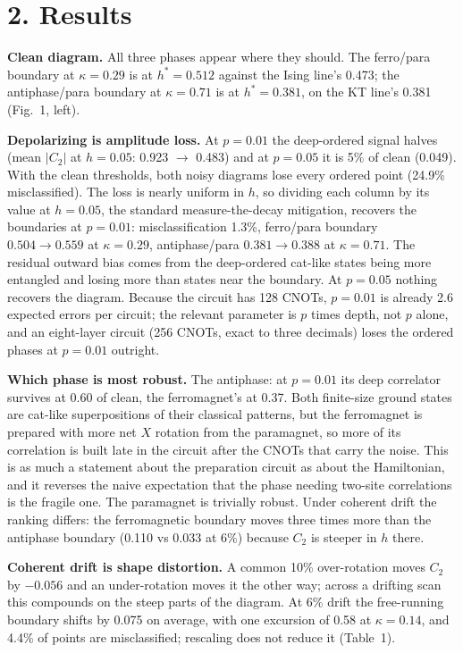 \documentclass[10pt,letterpaper]{article}
\begin{document}
\section*{2. Results}
\textbf{Clean diagram.} All three phases appear where they should. The ferro/para boundary at $\kappa=0.29$ is at $h^*=0.512$ against the Ising line's 0.473; the antiphase/para boundary at $\kappa=0.71$ is at $h^*=0.381$, on the KT line's 0.381 (Fig.~1, left).

\textbf{Depolarizing is amplitude loss.} At $p=0.01$ the deep-ordered signal halves (mean $|C_2|$ at $h=0.05$: 0.923 $\to$ 0.483) and at $p=0.05$ it is 5\% of clean (0.049). With the clean thresholds, both noisy diagrams lose every ordered point (24.9\% misclassified). The loss is nearly uniform in $h$, so dividing each column by its value at $h=0.05$, the standard measure-the-decay mitigation, recovers the boundaries at $p=0.01$: misclassification 1.3\%, ferro/para boundary $0.504\to0.559$ at $\kappa=0.29$, antiphase/para $0.381\to0.388$ at $\kappa=0.71$. The residual outward bias comes from the deep-ordered cat-like states being more entangled and losing more than states near the boundary. At $p=0.05$ nothing recovers the diagram. Because the circuit has 128 CNOTs, $p=0.01$ is already 2.6 expected errors per circuit; the relevant parameter is $p$ times depth, not $p$ alone, and an eight-layer circuit (256 CNOTs, exact to three decimals) loses the ordered phases at $p=0.01$ outright.

\textbf{Which phase is most robust.} The antiphase: at $p=0.01$ its deep correlator survives at 0.60 of clean, the ferromagnet's at 0.37. Both finite-size ground states are cat-like superpositions of their classical patterns, but the ferromagnet is prepared with more net $X$ rotation from the paramagnet, so more of its correlation is built late in the circuit after the CNOTs that carry the noise. This is as much a statement about the preparation circuit as about the Hamiltonian, and it reverses the naive expectation that the phase needing two-site correlations is the fragile one. The paramagnet is trivially robust. Under coherent drift the ranking differs: the ferromagnetic boundary moves three times more than the antiphase boundary (0.110 vs 0.033 at 6\%) because $C_2$ is steeper in $h$ there.

\textbf{Coherent drift is shape distortion.} A common 10\% over-rotation moves $C_2$ by $-0.056$ and an under-rotation moves it the other way; across a drifting scan this compounds on the steep parts of the diagram. At 6\% drift the free-running boundary shifts by 0.075 on average, with one excursion of 0.58 at $\kappa=0.14$, and 4.4\% of points are misclassified; rescaling does not reduce it (Table~1).
\end{document}
